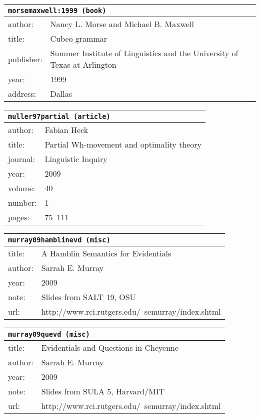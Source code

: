 \documentclass{article}
\begin{document}
\bigskip

\begin{tabular}{p{}p{}}
\multicolumn{2}{l}{\texttt{morsemaxwell:1999 (book)}}\\
\hline
author: & Nancy L. Morse and Michael B. Maxwell\\
title: & Cubeo grammar\\
publisher: & Summer Institute of Linguistics and the University of Texas at Arlington\\
year: & 1999\\
address: & Dallas\\
\end{tabular}

\bigskip

\begin{tabular}{p{}p{}}
\multicolumn{2}{l}{\texttt{muller97partial (article)}}\\
\hline
author: & Fabian Heck\\
title: & Partial Wh-movement and optimality theory\\
journal: & Linguistic Inquiry\\
year: & 2009\\
volume: & 40\\
number: & 1\\
pages: & 75--111\\
\end{tabular}

\bigskip

\begin{tabular}{p{}p{}}
\multicolumn{2}{l}{\texttt{murray09hamblinevd (misc)}}\\
\hline
title: & A \textsc{H}amblin Semantics for Evidentials\\
author: & Sarrah E. Murray\\
year: & 2009\\
note: & Slides from SALT 19, OSU\\
url: & http://www.rci.rutgers.edu/~semurray/index.shtml\\
\end{tabular}

\bigskip

\begin{tabular}{p{}p{}}
\multicolumn{2}{l}{\texttt{murray09quevd (misc)}}\\
\hline
title: & Evidentials and Questions in \textsc{C}heyenne\\
author: & Sarrah E. Murray\\
year: & 2009\\
note: & Slides from SULA 5, Harvard/MIT\\
url: & http://www.rci.rutgers.edu/~semurray/index.shtml\\
\end{tabular}
\end{document}
